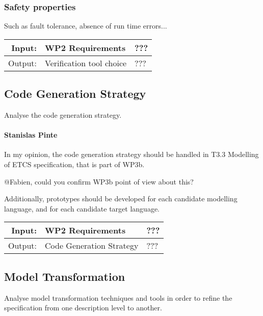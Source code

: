 \documentclass[11pt, a4paper]{article}
\newenvironment{inoutput}
{\vspace{2mm}
\noindent
\begin{tabular}{|r|p{.7\linewidth}|l|}
\hline}
{
\hline
\end{tabular}}
\begin{document}
\subsubsection{Safety properties}

Such as fault tolerance, absence of run time errors...

\begin{inoutput}
Input: & WP2 Requirements & ??? \\
\hline
Output: & Verification tool choice & ??? \\
\end{inoutput}


\subsection{Code Generation Strategy}

Analyse the code generation strategy.

\paragraph{Stanislas Pinte}
In my opinion, the code generation strategy should be handled in T3.3 Modelling of ETCS specification, that is part of WP3b.

@Fabien, could you confirm WP3b point of view about this? 

Additionally, prototypes should be developed for each candidate modelling language, and for each candidate target language. 

\begin{inoutput}
Input: & WP2 Requirements & ??? \\
\hline
Output: & Code Generation Strategy & ??? \\
\end{inoutput}

\subsection{Model Transformation}

Analyse model transformation techniques and tools in order to refine the specification from one description level to another.
\end{document}
